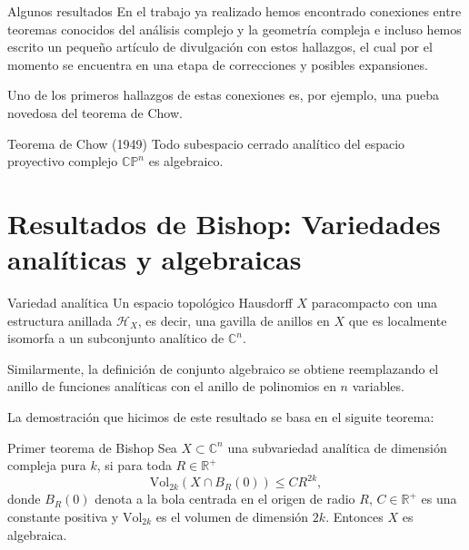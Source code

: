 \documentclass[letterpaper]{beamer}
\newcommand{\con}{\ensuremath{\mathbb{C}^n}}
\newcommand{\cp}{\ensuremath{\mathbb{CP}}}
\newcommand{\re}{\ensuremath{\mathbb R }}
\begin{document}
\begin{frame}
\begin{block}{Algunos resultados}
  En el trabajo ya realizado hemos encontrado conexiones entre teoremas conocidos del an\'alisis complejo y la geometr\'ia compleja e incluso hemos
  escrito un pequeño art\'iculo de divulgaci\'on con estos hallazgos, el cual por el momento se encuentra en una etapa de correcciones
  y posibles expansiones.
\end{block}
Uno de los primeros hallazgos de estas conexiones es, por ejemplo, una pueba novedosa del teorema de Chow.
\begin{block}{Teorema de Chow (1949)}\label{Chow}
        Todo subespacio cerrado anal\'itico del espacio proyectivo complejo $\cp^{n}$ es algebraico.
\end{block}
\end{frame}

\section{Resultados de Bishop: Variedades anal\'iticas y algebraicas}
\begin{frame}
  \begin{block}{Variedad analítica}
    Un espacio topol\'ogico Hausdorff $X$ paracompacto con una estructura anillada $\mathcal{H}_X$, es decir, una
    gavilla de anillos en $X$ que es localmente isomorfa a un subconjunto anal\'itico de $\con$.
  \end{block}
    Similarmente, la definici\'on de conjunto algebraico se obtiene reemplazando el anillo de funciones anal\'iticas con el anillo de polinomios en $n$ variables.
\end{frame}
\begin{frame}
    La demostraci\'on que hicimos de este resultado se basa en el siguite teorema:\\
      \begin{block}{Primer teorema de Bishop}\label{Bishop1}
        Sea $X\subset\con$ una subvariedad anal\'itica de dimensi\'on compleja pura $k$, si para toda $R\in\re^+$
        \[
          \textrm{Vol}_{2k}(X\cap B_R(0))\leq CR^{2k},
        \]
        donde $B_R(0)$ denota a la bola centrada en el origen de radio $R$, $C\in\re^{+}$ es una constante positiva
        y $\textrm{Vol}_{2k}$ es el volumen de dimensi\'on $2k$. Entonces $X$ es algebraica.
      \end{block}
\end{frame}
\end{document}
